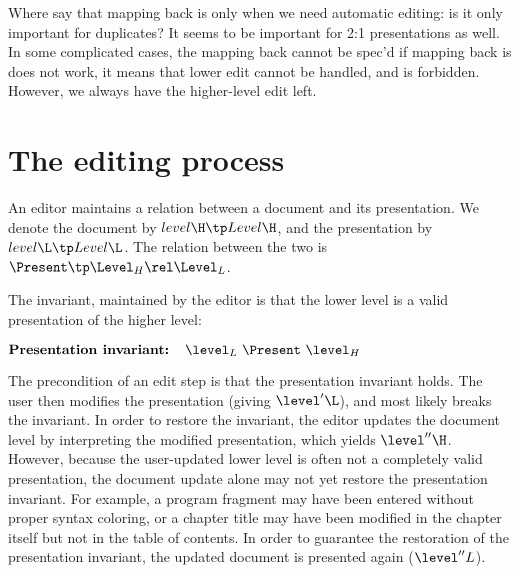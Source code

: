 

\bc
Where say that mapping back is only when we need automatic editing: is it only important for duplicates? It seems to be important for 2:1 presentations as well.  In some complicated cases, the mapping back cannot be spec'd if mapping back is does not work, it means that lower edit cannot be handled, and is forbidden. However, we always have the higher-level edit left.
\ec



%																
%																
%																
\section{The editing process}\label{sect:editProces}

An editor maintains a relation between a document and its presentation. We denote the document by $level\H \tp Level\H$, and the presentation by $level\L \tp Level\L$. The relation between the two is $\Present \tp \Level_{H} \rel \Level_{L}$. 

The invariant, maintained by the editor is that the lower level is a valid presentation of the higher level:

\begin{math}
\text{\bf Presentation invariant:~~~} \level_{L}~\Present~\level_{H}\\
\end{math}

The precondition of an edit step is that the presentation invariant holds. The user then modifies the presentation (giving $\level'\L$), and most likely breaks the invariant. In order to restore the invariant, the editor updates the document level by interpreting the modified presentation, which yields $\level''\H$. However, because the user-updated lower level is often not a completely valid presentation, the document update alone may not yet restore the presentation invariant. For example, a program fragment may have been entered without proper syntax coloring, or a chapter title may have been modified in the chapter itself but not in the table of contents. In order to guarantee the restoration of the presentation invariant, the updated document is presented again ($\level''L$).

